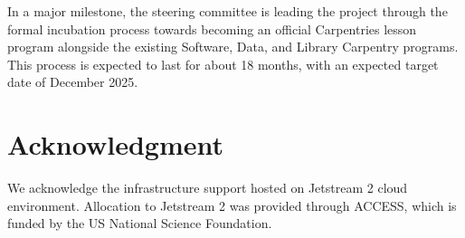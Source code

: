In a major milestone, the steering committee is leading the project through the formal incubation process towards becoming an official Carpentries lesson program alongside the existing Software, Data, and Library Carpentry programs.
This process is expected to last for about 18 months, with an expected target date of December 2025.


\section{Acknowledgment}

We acknowledge the infrastructure support hosted on Jetstream 2 cloud environment. Allocation to Jetstream 2 was provided through ACCESS, which is funded by the US National Science Foundation.
